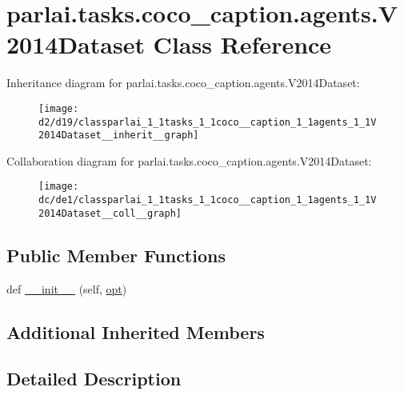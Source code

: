 \hypertarget{classparlai_1_1tasks_1_1coco__caption_1_1agents_1_1V2014Dataset}{}\section{parlai.\+tasks.\+coco\+\_\+caption.\+agents.\+V2014\+Dataset Class Reference}
\label{classparlai_1_1tasks_1_1coco__caption_1_1agents_1_1V2014Dataset}


Inheritance diagram for parlai.\+tasks.\+coco\+\_\+caption.\+agents.\+V2014\+Dataset\+:
\nopagebreak
\begin{figure}[H]
\begin{center}
\leavevmode
\texttt{[image: d2/d19/classparlai\_1\_1tasks\_1\_1coco\_\_caption\_1\_1agents\_1\_1V2014Dataset\_\_inherit\_\_graph]}
\end{center}
\end{figure}


Collaboration diagram for parlai.\+tasks.\+coco\+\_\+caption.\+agents.\+V2014\+Dataset\+:
\nopagebreak
\begin{figure}[H]
\begin{center}
\leavevmode
\texttt{[image: dc/de1/classparlai\_1\_1tasks\_1\_1coco\_\_caption\_1\_1agents\_1\_1V2014Dataset\_\_coll\_\_graph]}
\end{center}
\end{figure}
\subsection*{Public Member Functions}
\begin{DoxyCompactItemize}
\item 
def \hyperlink{classparlai_1_1tasks_1_1coco__caption_1_1agents_1_1V2014Dataset_ab08e77c45352c723e1bab7397473f71f}{\+\_\+\+\_\+init\+\_\+\+\_\+} (self, \hyperlink{classparlai_1_1tasks_1_1coco__caption_1_1agents_1_1DefaultDataset_adaa89b61b63ef4c1291774fda7abaf3c}{opt})
\end{DoxyCompactItemize}
\subsection*{Additional Inherited Members}


\subsection{Detailed Description}


